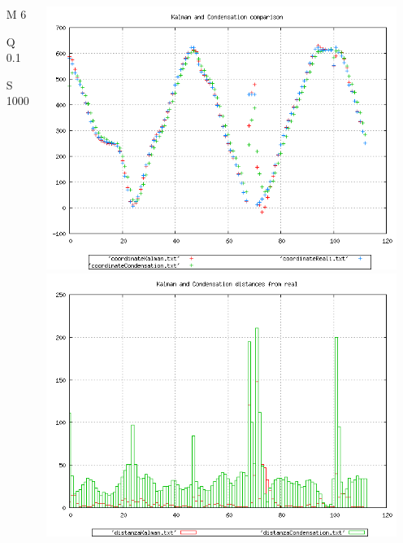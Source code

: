 {\begin{columns}
\begin{scriptsize}
\begin{itemize}
\item [M]6
\item [Q]0.1
\item [S]1000
\end{itemize}
\end{scriptsize}
\includegraphics[scale=0.1]{../esperimenti/single_car/mod_6-Q_0.1-S_1000/plot.png}\\
\includegraphics[scale=0.1]{../esperimenti/single_car/mod_6-Q_0.1-S_1000/plot-distances.png}


\end{columns}}
